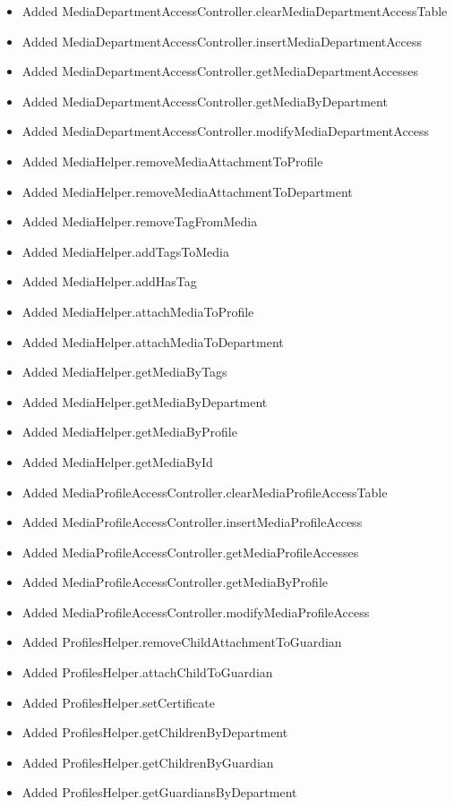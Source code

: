 \begin{itemize}
\begin{itemize}
		\item Added MediaDepartmentAccessController.clearMediaDepartmentAccessTable
		\item Added MediaDepartmentAccessController.insertMediaDepartmentAccess
		\item Added MediaDepartmentAccessController.getMediaDepartmentAccesses
		\item Added MediaDepartmentAccessController.getMediaByDepartment
		\item Added MediaDepartmentAccessController.modifyMediaDepartmentAccess
		\item Added MediaHelper.removeMediaAttachmentToProfile
		\item Added MediaHelper.removeMediaAttachmentToDepartment
		\item Added MediaHelper.removeTagFromMedia
		\item Added MediaHelper.addTagsToMedia
		\item Added MediaHelper.addHasTag
		\item Added MediaHelper.attachMediaToProfile
		\item Added MediaHelper.attachMediaToDepartment
		\item Added MediaHelper.getMediaByTags
		\item Added MediaHelper.getMediaByDepartment
		\item Added MediaHelper.getMediaByProfile
		\item Added MediaHelper.getMediaById
		\item Added MediaProfileAccessController.clearMediaProfileAccessTable
		\item Added MediaProfileAccessController.insertMediaProfileAccess
		\item Added MediaProfileAccessController.getMediaProfileAccesses
		\item Added MediaProfileAccessController.getMediaByProfile
		\item Added MediaProfileAccessController.modifyMediaProfileAccess
		\item Added ProfilesHelper.removeChildAttachmentToGuardian
		\item Added ProfilesHelper.attachChildToGuardian
		\item Added ProfilesHelper.setCertificate
		\item Added ProfilesHelper.getChildrenByDepartment
		\item Added ProfilesHelper.getChildrenByGuardian
		\item Added ProfilesHelper.getGuardiansByDepartment

\end{itemize}
\end{itemize}
